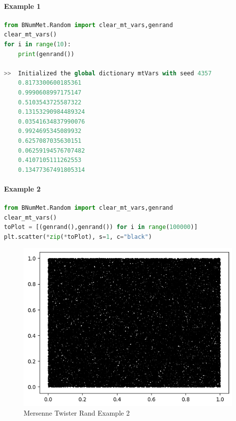 \paragraph{Example 1}{
\begin{lstlisting}[language=Python]
from BNumMet.Random import clear_mt_vars,genrand
clear_mt_vars()
for i in range(10):
    print(genrand())

>>  Initialized the global dictionary mtVars with seed 4357
    0.8173300600185361
    0.9990608997175147
    0.5103543725587322
    0.13153290984489324
    0.03541634837990076
    0.9924695345089932
    0.6257087035630151
    0.06259194576707482
    0.4107105111262553
    0.13477367491805314
\end{lstlisting}
}
\paragraph{Example 2}{
\begin{lstlisting}[language=Python]
from BNumMet.Random import clear_mt_vars,genrand
clear_mt_vars()
toPlot = [(genrand(),genrand()) for i in range(100000)]
plt.scatter(*zip(*toPlot), s=1, c="black")
\end{lstlisting}
\begin{figure}[H]
    \centering
    \includegraphics{Include/Images/Thesis/Documentation/Randomness/MersenneTwister Rand Example 2.png}
    \caption{Mersenne Twister Rand Example 2}
    \label{fig:Mersenne Twister Rand Example 2}
\end{figure}
}